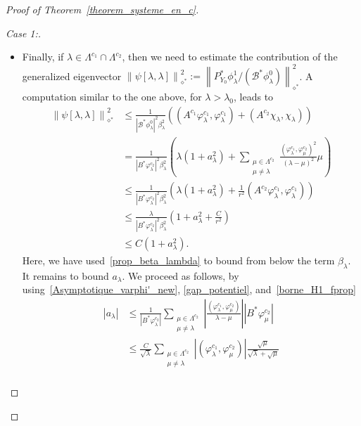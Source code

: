 \documentclass[AHL,Unicode,longabstracts]{cedram}
\newenvironment{step}[1]{\begin{proof}[#1]}{\let\qed\relax\end{proof}}
\newcommand{\fprop}[2]{\varphi^{#1}_{#2}}
\newcommand\Bs{\mathcal{B}^*}
\newcommand{\Fzp}{Y_0}
\newcommand{\normeXalphas}[1]{\left\| #1 \right\|_{\diamond^*}}
\newcommand{\PFa}{P_{\Fzp}^*}
\begin{document}
\begin{proof}[Proof of Theorem~\ref{theorem_systeme_en_c}]
\begin{step}{Case 1:}
\begin{itemize}
Using Parseval's identity, \eqref{borne_H1_fprop} and then~\eqref{ABM_xi_lambda}, we finally obtain
\begin{align*}
\normeXalphas{\psi[\lambda]}^2 & \leq \frac{1}{|B^* \xi_\lambda|^2} \left(\lambda + \frac{1}{r^2} (\fprop{c_1}{\lambda}, A^{c_2}\fprop{c_1}{\lambda}) \right) \\
& \leq \frac{\lambda}{|B^* \xi_\lambda|^2} \left(1 + \frac{C}{r^2}\right)\\
& \leq C.
\end{align*}

\item Finally, if $\lambda\in \Lambda^{c_1}\cap \Lambda^{c_2}$, then we need to estimate the contribution of the generalized eigenvector $\normeXalphas{\psi[\lambda,\lambda]}^2:=\normeXalphas{\PFa \phi_\lambda^1/(\Bs \phi_\lambda^0)}^2$. A computation similar to the one above, for $\lambda > \lambda_0$, leads to
\begin{align*}
\normeXalphas{\psi[\lambda,\lambda]}^2& \leq \frac{1}{|\Bs \phi_\lambda^0|^2 \beta_\lambda^2} \left((A^{c_1} \fprop{c_1}{\lambda},\fprop{c_1}{\lambda}) + (A^{c_2} \chi_\lambda,\chi_\lambda) \right) \\
& = \frac{1}{|B^* \fprop{c_2}{\lambda}|^2 \beta_\lambda^2} \left(\lambda (1+a_\lambda^2) + \sum_{\substack{\mu \in \Lambda^{c_2}\\ \mu\neq \lambda}} \frac{(\fprop{c_1}{\lambda},\fprop{c_2}{\mu})^2}{(\lambda-\mu)^2} \mu \right)\\
& \leq \frac{1}{|B^* \fprop{c_2}{\lambda}|^2 \beta_\lambda^2} \left(\lambda (1+a_\lambda^2) + \frac{1}{r^2} (A^{c_2}\fprop{c_1}{\lambda},\fprop{c_1}{\lambda}) \right)\\
& \leq \frac{\lambda}{|B^* \fprop{c_2}{\lambda}|^2 \beta_\lambda^2} \left(1+a_\lambda^2 + \frac{C}{r^2} \right)\\
& \leq C (1+a_\lambda^2).
\end{align*}
Here, we have used~\eqref{prop_beta_lambda} to bound from below the term $\beta_\lambda$. It remains to bound $a_\lambda$. We proceed as follows, by using~\eqref{Asymptotique_varphi'_new}, \eqref{gap_potentiel}, and~\eqref{borne_H1_fprop}
\begin{align*}
|a_\lambda| & \leq \frac{1}{|B^* \fprop{c_2}{\lambda}|} \sum_{\substack{\mu\in \Lambda^{c_2}\\ \mu \neq \lambda}} \left| \frac{(\fprop{c_1}{\lambda},\fprop{c_2}{\mu})}{\lambda-\mu}\right| |B^* \fprop{c_2}{\mu}| \\
& \leq \frac{C}{\sqrt{\lambda}} \sum_{\substack{\mu\in \Lambda^{c_2}\\ \mu \neq \lambda}} |(\fprop{c_1}{\lambda},\fprop{c_2}{\mu})| \frac{\sqrt{\mu}}{\sqrt{\lambda}+\sqrt{\mu}} \\

\end{align*}
\end{itemize}
\end{step}
\end{proof}
\end{document}
